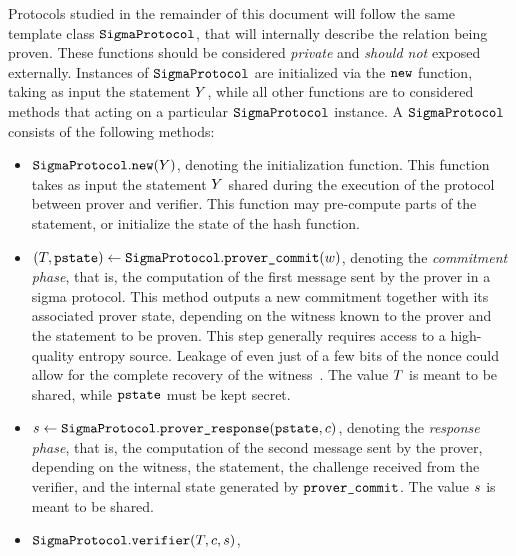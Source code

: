 \documentclass[11pt]{article}
\begin{document}
Protocols studied in the remainder of this document will follow the same template class $\texttt{SigmaProtocol}$, that will internally describe the relation being proven. These functions should be considered \emph{private} and \emph{should not} exposed externally.
Instances of $\texttt{SigmaProtocol}$ are initialized via the $\texttt{new}$ function, taking as input the statement $Y$, while all other functions are to considered methods that acting on a particular $\texttt{SigmaProtocol}$ instance.
A $\texttt{SigmaProtocol}$ consists of the following methods:
      \begin{itemize}
        \item $\texttt{SigmaProtocol}.\texttt{new}(Y)$,
        denoting the initialization function. This function takes as input the statement $Y$ shared during the execution of the protocol between prover and verifier.
        This function may pre-compute parts of the statement, or initialize the state of the hash function.
        \item
          $(T, \texttt{pstate})\gets \texttt{SigmaProtocol}.\texttt{prover\_commit}(w)$,
          denoting the \emph{commitment phase}, that is, the computation of the first message sent by the prover in a sigma protocol. This method outputs a new commitment together with its associated prover state, depending on the witness known to the prover and the statement to be proven.
          This step generally requires access to a high-quality entropy source.
          Leakage of even just of a few bits of the nonce could allow for the complete recovery of the witness~\cite{lattice-attack,bleichenbacher,CCS:ANTTY20}.
					The value $T$ is meant to be shared, while $\texttt{pstate}$ must be kept secret.
        \item
          $s \gets \texttt{SigmaProtocol}.\texttt{prover\_response}(\texttt{pstate}, c)$,
          denoting the \emph{response phase}, that is, the computation of the second message sent by the prover, depending on the witness, the statement, the challenge received from the verifier, and the internal state generated by $\texttt{prover\_commit}$.
          The value $s$ is meant to be shared.
        \item $\texttt{SigmaProtocol}.\texttt{verifier}(T, c, s)$,

\end{itemize}
\end{document}
